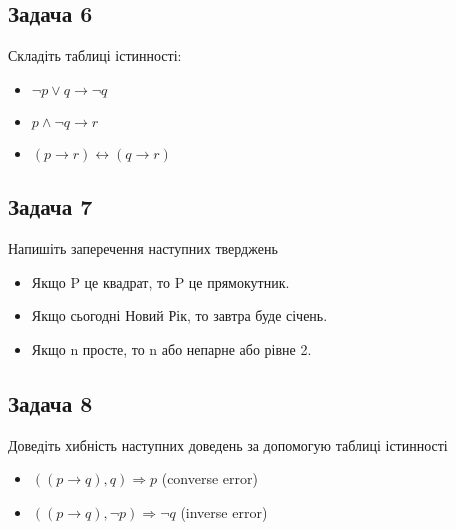 \documentclass{article}
\begin{document}
\subsection*{Задача 6}
Складіть таблиці істинності:
\begin{itemize}
    \item $\lnot p \lor q \rightarrow \lnot q$
    \item $p \land \lnot q \rightarrow r $
    \item $(p \rightarrow r) \leftrightarrow (q \rightarrow r)$
\end{itemize}


\subsection*{Задача 7}
Напишіть заперечення наступних тверджень
\begin{itemize}
    \item Якщо P це квадрат, то P це прямокутник.
    \item Якщо сьогодні Новий Рік, то завтра буде січень.
    \item Якщо n просте, то n або непарне або рівне 2.
\end{itemize}

\subsection*{Задача 8}
Доведіть хибність наступних доведень за допомогую таблиці істинності
\begin{itemize}
    \item $((p \rightarrow q), q) \Rightarrow p$ (converse error)
    \item $((p \rightarrow q), \lnot p) \Rightarrow \lnot q$ (inverse error)
\end{itemize}
\end{document}
